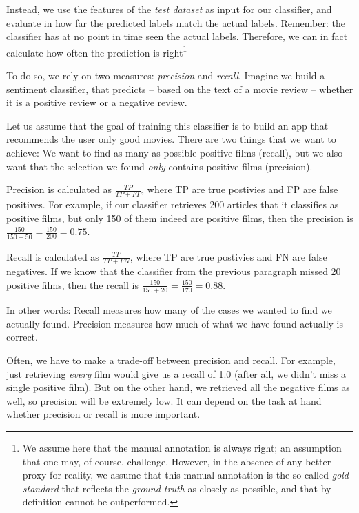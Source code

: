 Instead, we use the features of the \emph{test dataset} as input for our classifier,
and evaluate in how far the predicted labels match the actual labels.
Remember: the classifier has at no point in time seen the actual labels.
Therefore, we can in fact calculate how often the prediction is right\footnote{We
  assume here that the manual annotation is always right; an assumption that one
  may, of course, challenge. However, in the absence of any better proxy for
  reality, we assume that this manual annotation is the so-called \emph{gold standard}
  that reflects the \emph{ground truth} as closely as possible, and that by
  definition cannot be outperformed.}


To do so, we rely on two measures: \emph{precision} and \emph{recall}.
Imagine we build a sentiment classifier, that predicts -- based on the text of a movie review -- whether it is a positive review or a negative review. 

Let us assume that the goal of training this classifier is to build an app that recommends the user only good movies. There are two things that we want to achieve: We want to find as many as possible positive films (recall), but we also want that the selection we found \emph{only} contains positive films (precision).

Precision is calculated as $\frac{TP}{TP+FP}$, where TP are true postivies and FP are false positives. For example, if our classifier retrieves 200 articles that it classifies as positive films, but only 150 of them indeed are positive films, then the precision is $\frac{150}{150+50} = \frac{150}{200} = 0.75$.

Recall is calculated as $\frac{TP}{TP+FN}$, where TP are true postivies and FN are false negatives. If we know that the classifier from the previous paragraph missed 20 positive films, then the recall is $\frac{150}{150+20} = \frac{150}{170}= 0.88$.

In other words: Recall measures how many of the cases we wanted to find we actually found. Precision measures how much of what we have found actually is correct.

Often, we have to make a trade-off between precision and recall. For example, just retrieving \emph{every} film would give us a recall of 1.0 (after all, we didn't miss a single positive film). But on the other hand, we retrieved all the negative films as well, so precision will be extremely low. It can depend on the task at hand whether precision or recall is more important.


